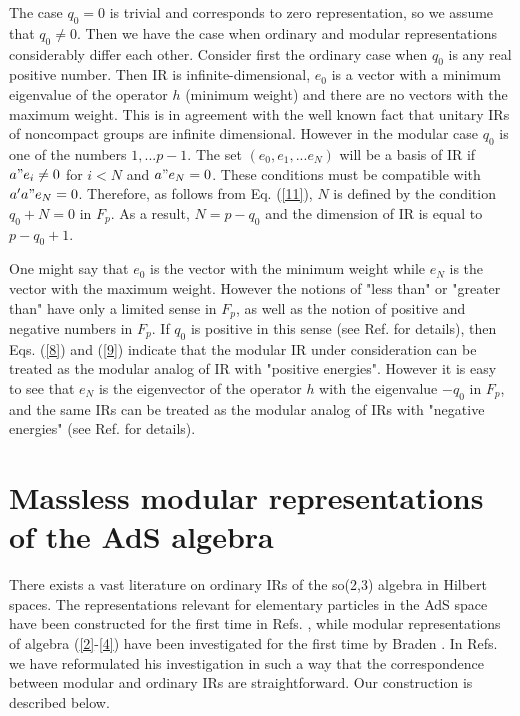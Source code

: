 \documentclass[a4paper,12pt]{article}%
\begin{document}
The case $q_0=0$ is trivial and corresponds to zero representation,
so we assume that $q_0\neq 0$. Then we have the case when ordinary 
and modular representations considerably differ each other. 
Consider first the ordinary case when $q_0$ is any real positive 
number. Then IR is infinite-dimensional, $e_0$ is a vector
with a minimum eigenvalue of the operator $h$ (minimum weight)
and there are no vectors with the maximum weight. This is in 
agreement with the well known fact that unitary IRs of
noncompact groups are infinite dimensional. However in the
modular case $q_0$ is one of the numbers $1,...p-1$. 
The set $(e_0,e_1,...e_N)$ will be a basis
of IR if $a"e_i\neq 0$ for $i<N$ and $a"e_N=0$. These conditions
must be compatible with $a'a"e_N=0$. Therefore, as follows from
Eq. (\ref{11}), $N$ is defined by the condition $q_0+N=0$ in
$F_p$. As a result, $N=p-q_0$ and the dimension of IR is equal
to $p-q_0+1$.  

One might say that $e_0$ is the vector with the
minimum weight while $e_N$ is the vector with the maximum weight.
However the notions of "less than" or "greater than" have only
a limited sense in $F_p$, as well as the notion of positive
and negative numbers in $F_p$. If $q_0$ is positive in this sense
(see Ref. \cite{lev2} for details), then Eqs. (\ref{8}) and
(\ref{9}) indicate that the modular IR under consideration can be 
treated as the modular analog of IR with "positive energies".
However it is easy to see that $e_N$ is the
eigenvector of the operator $h$ with the eigenvalue $-q_0$ in
$F_p$, and the same IRs can be treated as the modular analog
of IRs with "negative energies" (see Ref. \cite{lev2} for
details). 

\section{Massless modular representations of the AdS algebra}
\label{S3}

There exists a vast literature on ordinary IRs of the so(2,3) 
algebra in Hilbert spaces. The representations relevant for 
elementary particles in the AdS space have been constructed 
for the first time in Refs. \cite{Fronsdal,Evans}, while 
modular representations of algebra (\ref{2}-\ref{4}) have 
been investigated for the first time by Braden \cite{Braden}. 
In Refs. \cite{lev1,lev2} we have reformulated his 
investigation in such a way that the correspondence between 
modular and ordinary IRs are straightforward. Our construction
is described below. 
\end{document}
